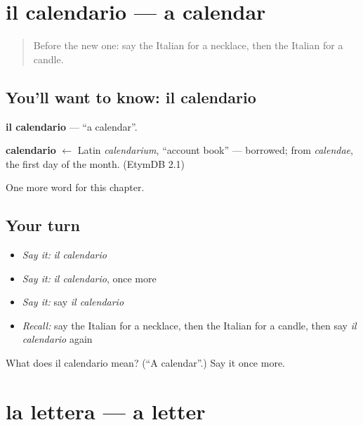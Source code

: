 \section[il calendario]{il calendario — a calendar}

\label{lesson:IT-C101-calendario}



\begin{quote}
Before the new one: say the Italian for a necklace, then the Italian for a candle.
\end{quote}

\subsection*{You'll want to know: il calendario}
\textbf{il calendario} — \textquotedblleft{}a calendar\textquotedblright{}.

\begin{cousinweb}
\textbf{calendario} $\leftarrow$ Latin \emph{calendarium}, \textquotedblleft{}account book\textquotedblright{} — borrowed; from \emph{calendae}, the first day of the month. (EtymDB 2.1)
\end{cousinweb}

\begin{grammarlens}[title={What you've built}]
One more word for this chapter.
\end{grammarlens}

\subsection*{Your turn}
\begin{itemize}
\raggedright
  \item \emph{Say it:} \emph{il calendario}
  \item \emph{Say it:} \emph{il calendario}, once more
  \item \emph{Say it:} say \emph{il calendario}
  \item \emph{Recall:} say the Italian for a necklace, then the Italian for a candle, then say \emph{il calendario} again
\end{itemize}

\begin{tcolorbox}[breakable,colback=teal!4,colframe=teal!35!black,title={Before you move on}]
What does il calendario mean? (\textquotedblleft{}A calendar\textquotedblright{}.) Say it once more.
\end{tcolorbox}
\section[la lettera]{la lettera — a letter}

